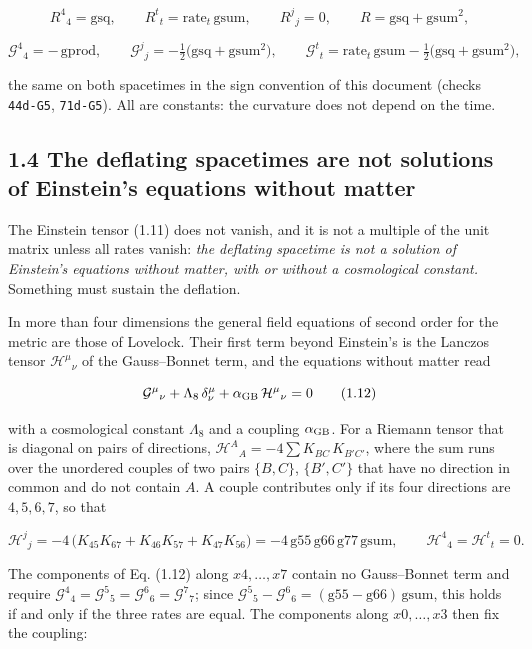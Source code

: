 \documentclass[
  10pt,
]{article}
\begin{document}
\[R^4{}_4=\mathrm{gsq},\qquad R^t{}_t=\mathrm{rate}_t\,\mathrm{gsum},\qquad R^j{}_j=0,\qquad
R=\mathrm{gsq}+\mathrm{gsum}^2,\tag{1.10}\]

\[\mathcal G^4{}_4=-\,\mathrm{gprod},\qquad
\mathcal G^j{}_j=-\tfrac12\big(\mathrm{gsq}+\mathrm{gsum}^2\big),\qquad
\mathcal G^t{}_t=\mathrm{rate}_t\,\mathrm{gsum}-\tfrac12\big(\mathrm{gsq}+\mathrm{gsum}^2\big),\tag{1.11}\]

the same on both spacetimes in the sign convention of this document
(checks \texttt{44d-G5}, \texttt{71d-G5}). All are constants: the
curvature does not depend on the time.

\hypertarget{the-deflating-spacetimes-are-not-solutions-of-einsteins-equations-without-matter}{%
\subsection{1.4 The deflating spacetimes are not solutions of Einstein's
equations without
matter}\label{the-deflating-spacetimes-are-not-solutions-of-einsteins-equations-without-matter}}

The Einstein tensor (1.11) does not vanish, and it is not a multiple of
the unit matrix unless all rates vanish: \emph{the deflating spacetime
is not a solution of Einstein's equations without matter, with or
without a cosmological constant.} Something must sustain the deflation.

In more than four dimensions the general field equations of second order
for the metric are those of Lovelock. Their first term beyond Einstein's
is the Lanczos tensor \(\mathcal H^\mu{}_\nu\) of the Gauss--Bonnet
term, and the equations without matter read

\[\mathcal G^\mu{}_\nu+\Lambda_8\,\delta^\mu_\nu+\alpha_{\rm GB}\,\mathcal H^\mu{}_\nu=0\tag{1.12}\]

with a cosmological constant \(\Lambda_8\) and a coupling
\(\alpha_{\rm GB}\). For a Riemann tensor that is diagonal on pairs of
directions, \(\mathcal H^A{}_A=-4\sum K_{BC}\,K_{B'C'}\), where the sum
runs over the unordered couples of two pairs \(\{B,C\}\), \(\{B',C'\}\)
that have no direction in common and do not contain \(A\). A couple
contributes only if its four directions are \(4,5,6,7\), so that

\[\mathcal H^j{}_j=-4\,\big(K_{45}K_{67}+K_{46}K_{57}+K_{47}K_{56}\big)
=-4\,\mathrm{g55}\,\mathrm{g66}\,\mathrm{g77}\,\mathrm{gsum},\qquad
\mathcal H^4{}_4=\mathcal H^t{}_t=0.\tag{1.13}\]

The components of Eq. (1.12) along \(x4,\dots,x7\) contain no
Gauss--Bonnet term and require
\(\mathcal G^4{}_4=\mathcal G^5{}_5=\mathcal G^6{}_6=\mathcal G^7{}_7\);
since
\(\mathcal G^5{}_5-\mathcal G^6{}_6=(\mathrm{g55}-\mathrm{g66})\,\mathrm{gsum}\),
this holds if and only if the three rates are equal. The components
along \(x0,\dots,x3\) then fix the coupling:
\end{document}
